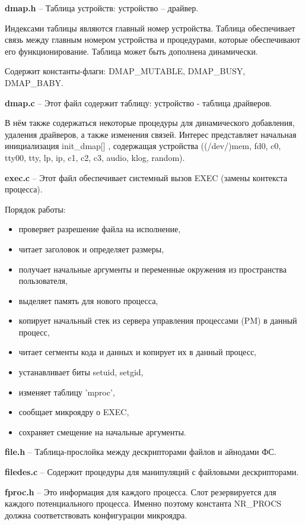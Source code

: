 \textbf{dmap.h} -- Таблица устройств: устройство -- драйвер.

Индексами таблицы являются главный номер устройства. Таблица обеспечивает связь между главным номером устройства и процедурами, которые обеспечивают его функционирование. Таблица может быть дополнена динамически.

Содержит константы-флаги: DMAP\_MUTABLE, DMAP\_BUSY, DMAP\_BABY.

\textbf{dmap.c} -- Этот файл содержит таблицу: устройство - таблица драйверов.

В нём также содержаться некоторые процедуры для динамического добавления, удаления драйверов, а также изменения связей. Интерес представляет начальная инициализация init\_dmap[] , содержащая устройства ((/dev/)mem, fd0, c0, tty00, tty, lp, ip, c1, c2, c3, audio, klog, random).

\textbf{exec.c} -- Этот файл обеспечивает системный вызов EXEC (замены контекста процесса).

Порядок работы:
\begin{itemize}
\item проверяет разрешение файла на исполнение,
\item читает заголовок и определяет размеры,
\item получает начальные аргументы и переменные окружения из пространства пользователя,
\item выделяет память для нового процесса,
\item копирует начальный стек из сервера управления процессами (PM) в данный процесс,
\item читает сегменты кода и данных и копирует их в данный процесс,
\item устанавливает биты setuid, setgid,
\item изменяет таблицу 'mproc',
\item сообщает микроядру о EXEC,
\item сохраняет смещение на начальные аргументы.
\end{itemize}

\textbf{file.h} -- Таблица-прослойка между дескрипторами файлов и айнодами ФС.

\textbf{filedes.c} -- Содержит процедуры для манипуляций с файловыми дескрипторами.

\textbf{fproc.h} -- Это информация для каждого процесса. Слот резервируется для каждого потенциального процесса. Именно поэтому константа NR\_PROCS должна соответствовать конфигурации микроядра.

